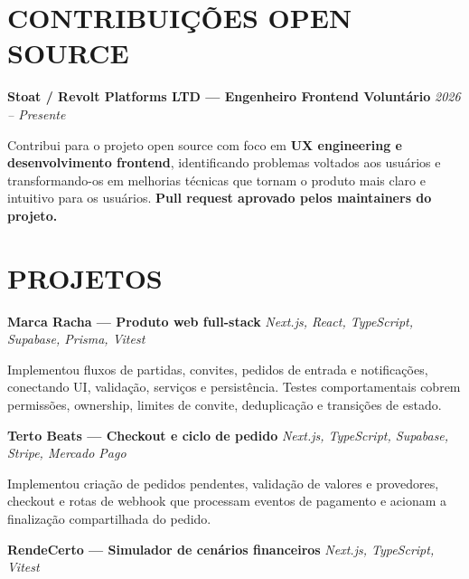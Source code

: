\documentclass[10pt,a4paper]{article}
\begin{document}

\section*{CONTRIBUIÇÕES OPEN SOURCE}

\noindent
\textbf{Stoat / Revolt Platforms LTD — Engenheiro Frontend Voluntário}
\hfill
\textit{2026 -- Presente}

\footnotesize

Contribui para o projeto open source com foco em
\textbf{UX engineering e desenvolvimento frontend}, identificando
problemas voltados aos usuários e transformando-os em melhorias
técnicas que tornam o produto mais claro e intuitivo para os
usuários.
\textbf{Pull request aprovado pelos maintainers do projeto.}


\section*{PROJETOS}

\noindent
\textbf{Marca Racha — Produto web full-stack}
\hfill
\textit{Next.js, React, TypeScript, Supabase, Prisma, Vitest}

\footnotesize

Implementou fluxos de partidas, convites, pedidos de entrada e notificações, conectando UI, validação, serviços e persistência. Testes comportamentais cobrem permissões, ownership, limites de convite, deduplicação e transições de estado.

\vspace{0.5pt}

\noindent
\textbf{Terto Beats — Checkout e ciclo de pedido}
\hfill
\textit{Next.js, TypeScript, Supabase, Stripe, Mercado Pago}

\footnotesize

Implementou criação de pedidos pendentes, validação de valores e provedores, checkout e rotas de webhook que processam eventos de pagamento e acionam a finalização compartilhada do pedido.

\vspace{0.5pt}

\noindent
\textbf{RendeCerto — Simulador de cenários financeiros}
\hfill
\textit{Next.js, TypeScript, Vitest}
\end{document}
